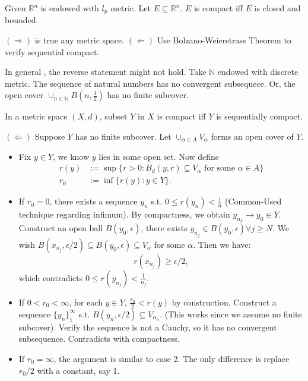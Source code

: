 \documentclass[12pt]{article}
\begin{document}
\begin{theorem}
    Given $\mathbb{R}^n$ is endowed with $l_p$ metric. Let $E\subseteq \mathbb{R}^n$.
    $E$ is compact iff $E$ is closed and bounded.
\end{theorem}

\begin{pfbox}
    $(\Rightarrow)$ is true any metric space. $(\Leftarrow)$ Use Bolzano-Weierstrass Theorem to verify sequential compact.
\end{pfbox}

\begin{pbox}
\begin{remark}
In general , the reverse statement might not hold.
Take $\mathbb{N}$ endowed with discrete metric. The sequence of natural numbers has no convergent subsequece. Or, the open cover $\cup_{n\in \mathbb{N}}B(n,\frac{1}{2})$ has no finite subcover.
\end{remark}
\end{pbox}

\begin{theorem}
    In a metric space $(X,d)$, subset $Y$ in $X$ is compact iff $Y$ is sequentially compact.
\end{theorem}


\begin{pfbox}
$(\Leftarrow)$ Suppose $Y$ has no finite subcover. Let $\cup_{\alpha\in A}V_\alpha$ forms an open cover of $Y$.
\begin{itemize}
\item Fix $y\in Y$, we know $y$ lies in some open set. Now define 
\begin{align*}
    r(y)&:=\sup\{r>0:B_d(y,r)\subseteq V_{\alpha} \text{ for some }\alpha\in A\}\\
    r_0 &:= \inf\{r(y):y\in Y\}.
\end{align*}

\item If $r_0=0$, there exists a sequence $y_n$ s.t. $0\leq r(y_n)<\frac{1}{n}$ (Common-Used technique regarding infimum).
      By compactness, we obtain $y_{n_k}\rightarrow y_0\in Y$.
      Construct an open ball $B(y_0, \epsilon)$, there exists $y_{n_j}\in B(y_0, \epsilon) \forall j\geq N$.
      We wish $B(x_{n_j},\epsilon/2)\subseteq B(y_0, \epsilon)\subseteq V_{\alpha}$ for some $\alpha$.
      Then we have:
      \[r(x_{n_j})\geq \epsilon/2,\] which contradicts $0\leq r(y_{n_j})<\frac{1}{n_j}.$
\item If $0<r_0<\infty$, for each $y\in Y,\, \frac{r_0}{2}<r(y)$ by construction.
      Construct a sequence $\{y_n\}^\infty_1$ s.t. $B(y_n,\epsilon/2)\subseteq V_{\alpha_n}$. (This works since we assume no finite subcover).
      Verify the sequence is not a Cauchy, so it has no convergent subsequence. Contradicts with compactness.
\item If $r_0=\infty$, the argument is similar to case 2. The only difference is replace $r_0/2$ with a constant, say 1.
\end{itemize}
\end{pfbox}
\end{document}
